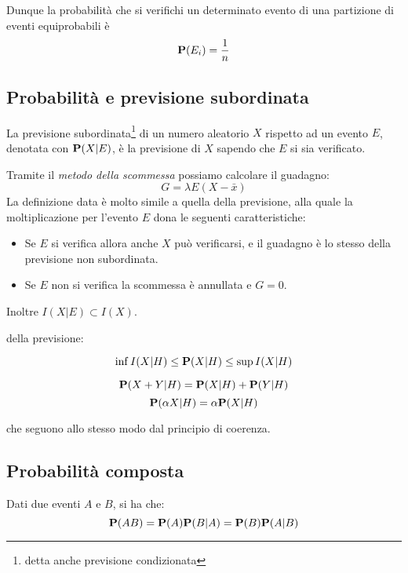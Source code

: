 Dunque la probabilità che si verifichi un determinato evento di una partizione di eventi equiprobabili è
\[ \mathbf{P}(E_i) = \frac{1}{n} \]

\subsection{Probabilità e previsione subordinata}
\begin{definition}
  La previsione subordinata\footnote{detta anche previsione condizionata} di un numero aleatorio $X$ rispetto ad un evento $E$, denotata con \( \mathbf{P}(X|E) \), è la previsione di $X$ sapendo che $E$ si sia verificato.
\end{definition}

Tramite il \emph{metodo della scommessa} possiamo calcolare il guadagno:
\[ G = \lambda E (X - \bar{x}) \]
La definizione data è molto simile a quella della previsione, alla quale la moltiplicazione per l'evento $E$ dona le seguenti caratteristiche:
\begin{itemize}
\item Se $E$ si verifica allora anche $X$ può verificarsi, e il guadagno è lo stesso della previsione non subordinata.
\item Se $E$ non si verifica la scommessa è annullata e \( G = 0 \).
\end{itemize}

Inoltre \( I(X|E) \subset I(X) \).

 della previsione:
\begin{definition}[Monotonia]\label{pro:monotonia_previsione_subordinata}
  \[ \inf I(X|H) \le \mathbf{P}(X|H) \le \sup I(X|H) \]
\end{definition}

\begin{definition}[Linearità]\label{pro:linearita_previsione_subordinata}
  \[ \mathbf{P}(X + Y|H) = \mathbf{P}(X|H) + \mathbf{P}(Y|H) \]
  \[ \mathbf{P}(\alpha X|H) = \alpha \mathbf{P}(X|H) \]
\end{definition}

che seguono allo stesso modo dal principio di coerenza.

\subsection{Probabilità composta}
\begin{theorem}\label{thm:probabilita_composta}
  Dati due eventi $A$ e $B$, si ha che:
  \[ \mathbf{P}(AB) = \mathbf{P}(A)\mathbf{P}(B|A) = \mathbf{P}(B)\mathbf{P}(A|B) \]
\end{theorem}


